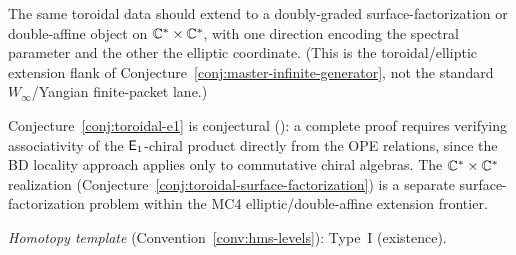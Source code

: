 \begin{conjecture}
\label{conj:toroidal-surface-factorization}
The same toroidal data should extend to a doubly-graded
surface-factorization or double-affine object on
$\mathbb{C}^* \times \mathbb{C}^*$, with one direction encoding the spectral
parameter and the other the elliptic coordinate.
(This is the toroidal/elliptic extension flank of
Conjecture~\ref{conj:master-infinite-generator}, not the standard
$W_\infty$/Yangian finite-packet lane.)
\end{conjecture}

\begin{remark}[Scope]
Conjecture~\ref{conj:toroidal-e1} is conjectural (\ClaimStatusConjectured): a complete proof requires verifying associativity of the $\mathsf{E}_1$-chiral product directly from the OPE relations, since the BD locality approach applies only to commutative chiral algebras.  The $\mathbb{C}^* \times \mathbb{C}^*$ realization (Conjecture~\ref{conj:toroidal-surface-factorization}) is a separate surface-factorization problem within the MC4 elliptic/double-affine extension frontier.

\emph{Homotopy template} (Convention~\ref{conv:hms-levels}): Type~I (existence).
\end{remark}

